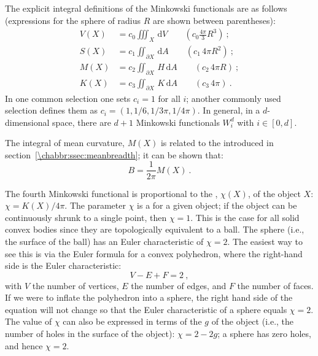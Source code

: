 The explicit integral definitions of the Minkowski functionals are as follows (expressions for the sphere of radius $R$ are shown between parentheses):
\begin{equation}
\begin{split}
	V(X) &= c_0\iiint_X\,\mathrm{d}V \qquad\left(c_0\frac{4\pi}{3}R^3\right)\ ;\\
	S(X) &= c_1\iint_{\partial X}\,\mathrm{d}A \qquad\left(c_1\, 4\pi R^2\right)\ ;\\
	M(X) &= c_2\iint_{\partial X}\,H\,\mathrm{d}A \qquad\left(c_2\, 4\pi R\right)\ ;\\
	K(X) &= c_3\iint_{\partial X}\,K\,\mathrm{d}A \qquad\left(c_3\, 4\pi\right)\ .
\end{split}
\end{equation}
In one common selection one sets $c_i=1$ for all $i$; another commonly used selection defines them as $c_i=(1, 1/6, 1/3\pi, 1/4\pi)$.  In general, in a $d$-dimensional space, there are $d+1$ Minkowski functionals $W^d_i$ with $i\in[0,d]$.

The integral of mean curvature, $M(X)$ is related to the  introduced in section~\ref{\chabbr:ssec:meanbreadth}; it can be shown that:
\begin{equation}
	B = \frac{1}{2\pi} M(X)\ .
\end{equation}

The fourth Minkowski functional is proportional to the , $\chi(X)$, of the object $X$: $\chi = K(X)/4\pi$. The parameter $\chi$ is a  for a given object; if the object can be continuously shrunk to a single point, then $\chi=1$.  This is the case for all solid convex bodies since they are topologically equivalent to a ball. The sphere (i.e., the surface of the ball) has an Euler characteristic of $\chi=2$. The easiest way to see this is via the Euler formula for a convex polyhedron, where the right-hand side is the Euler characteristic:
\[
	V-E+F = 2\ ,
\]
with $V$ the number of vertices, $E$ the number of edges, and $F$ the number of faces.  If we were to inflate the polyhedron into a sphere, the right hand side of the equation will not change so that the Euler characteristic of a sphere equals $\chi=2$. The value of $\chi$ can also be expressed in terms of the  $g$ of the object (i.e., the number of holes in the surface of the object): $\chi = 2-2g$; a sphere has zero holes, and hence $\chi=2$.

